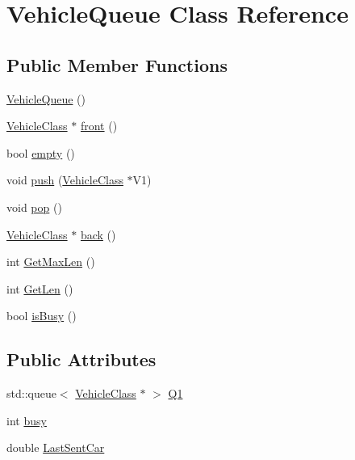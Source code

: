 \hypertarget{class_vehicle_queue}{\section{Vehicle\-Queue Class Reference}
\label{class_vehicle_queue}
}
\subsection*{Public Member Functions}
\begin{DoxyCompactItemize}
\item 
\hyperlink{class_vehicle_queue_a19f80d40ffe612dae9b2cbce39fe1a1a}{Vehicle\-Queue} ()
\item 
\hyperlink{class_vehicle_class}{Vehicle\-Class} $\ast$ \hyperlink{class_vehicle_queue_aff7fef0dc6401e38a26bc34ee0e78f2a}{front} ()
\item 
bool \hyperlink{class_vehicle_queue_a9c22a63f1c7562bc14be172a38cffcb9}{empty} ()
\item 
void \hyperlink{class_vehicle_queue_a71dfef194e7e2cbfdca2b724d66301b8}{push} (\hyperlink{class_vehicle_class}{Vehicle\-Class} $\ast$V1)
\item 
void \hyperlink{class_vehicle_queue_ad4f16ccf1a5990172e28b7782051b50a}{pop} ()
\item 
\hyperlink{class_vehicle_class}{Vehicle\-Class} $\ast$ \hyperlink{class_vehicle_queue_a302883b18a07a99dacd614ee5332f09e}{back} ()
\item 
int \hyperlink{class_vehicle_queue_a4d5dc7f4ee55be52e781b252e6260ba1}{Get\-Max\-Len} ()
\item 
int \hyperlink{class_vehicle_queue_ae443ecfa4227dbb5094f1bd33e77abb0}{Get\-Len} ()
\item 
bool \hyperlink{class_vehicle_queue_ada2e9158033c24433b042ab46abe2fb8}{is\-Busy} ()
\end{DoxyCompactItemize}
\subsection*{Public Attributes}
\begin{DoxyCompactItemize}
\item 
std\-::queue$<$ \hyperlink{class_vehicle_class}{Vehicle\-Class} $\ast$ $>$ \hyperlink{class_vehicle_queue_a64dd34f2ca5bee22e9bf07be665c4d13}{Q1}
\item 
int \hyperlink{class_vehicle_queue_a4ce16496b3665d0b91a8b5baf158c3a3}{busy}
\item 
double \hyperlink{class_vehicle_queue_a329310055fa8fd635fd6740a8400b88d}{Last\-Sent\-Car}
\end{DoxyCompactItemize}


